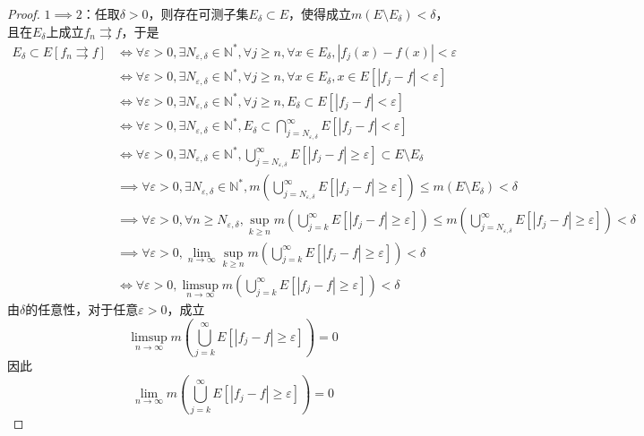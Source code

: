 \documentclass[lang = cn, scheme = chinese, thmcnt = section]{elegantbook}
\newcommand{\N}{\mathbb{N}}            %
\newcommand{\sub}{\subset}             %
\begin{document}
\begin{proof}
	$1\implies 2$：任取$\delta>0$，则存在可测子集$E_\delta\sub E$，使得成立$m(E\setminus E_\delta)<\delta$，且在$E_\delta$上成立$f_n\rightrightarrows f$，于是
	\begin{align*}
		E_\delta\sub E[f_n\rightrightarrows f]
		& \iff \forall \varepsilon>0,\exists N_{\varepsilon,\delta}\in\N^*,\forall j\ge n,\forall x\in E_\delta,|f_j(x)-f(x)|<\varepsilon \\
		& \iff \forall \varepsilon>0,\exists N_{\varepsilon,\delta}\in\N^*,\forall j\ge n,\forall x\in E_\delta,x\in E[|f_j-f|<\varepsilon] \\
		& \iff \forall \varepsilon>0,\exists N_{\varepsilon,\delta}\in\N^*,\forall j\ge n,E_\delta\sub E[|f_j-f|<\varepsilon] \\
		& \iff \forall \varepsilon>0,\exists N_{\varepsilon,\delta}\in\N^*,E_\delta\sub\bigcap_{j=N_{\varepsilon,\delta}}^{\infty} E[|f_j-f|<\varepsilon] \\
		& \iff \forall \varepsilon>0,\exists N_{\varepsilon,\delta}\in\N^*,\bigcup_{j=N_{\varepsilon,\delta}}^{\infty} E[|f_j-f|\ge \varepsilon]\sub E\setminus E_\delta \\
		& \implies \forall \varepsilon>0,\exists N_{\varepsilon,\delta}\in\N^*,m\left(\bigcup_{j=N_{\varepsilon,\delta}}^{\infty} E[|f_j-f|\ge \varepsilon]\right)\le m(E\setminus E_\delta)<\delta \\
		& \implies \forall \varepsilon>0,\forall n\ge N_{\varepsilon,\delta},\sup_{k\ge n}m\left(\bigcup_{j=k}^{\infty} E[|f_j-f|\ge \varepsilon]\right)\le m\left(\bigcup_{j=N_{\varepsilon,\delta}}^{\infty} E[|f_j-f|\ge \varepsilon]\right)<\delta \\
		& \implies \forall \varepsilon>0,\lim_{n\to\infty}\sup_{k\ge n}m\left(\bigcup_{j=k}^{\infty} E[|f_j-f|\ge \varepsilon]\right)<\delta \\
		& \iff \forall \varepsilon>0,\limsup_{n\to\infty}m\left(\bigcup_{j=k}^{\infty} E[|f_j-f|\ge \varepsilon]\right)<\delta
	\end{align*}
	由$\delta$的任意性，对于任意$\varepsilon>0$，成立%
	$$
	\limsup_{n\to\infty}m\left(\bigcup_{j=k}^{\infty} E[|f_j-f|\ge \varepsilon]\right)=0
	$$
	因此
	$$
	\lim_{n\to\infty}m\left(\bigcup_{j=k}^{\infty} E[|f_j-f|\ge \varepsilon]\right)=0
	$$
	

\end{proof}
\end{document}
